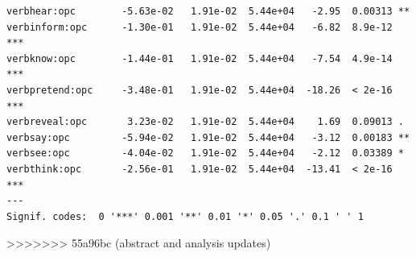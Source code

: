 \documentclass[10pt]{article}\usepackage[]{graphicx}\usepackage[dvipsnames]{xcolor}
\makeatletter
\newenvironment{kframe}{%
 \def\at@end@of@kframe{}%
 \ifinner\ifhmode%
  \def\at@end@of@kframe{\end{minipage}}%
  \begin{minipage}{\columnwidth}%
 \fi\fi%
 \def\FrameCommand##1{\hskip\@totalleftmargin \hskip-\fboxsep
 \colorbox{shadecolor}{##1}\hskip-\fboxsep
     \hskip-\linewidth \hskip-\@totalleftmargin \hskip\columnwidth}%
 \MakeFramed {\advance\hsize-\width
   \@totalleftmargin\z@ \linewidth\hsize
   \@setminipage}}%
 {\par\unskip\endMakeFramed%
 \at@end@of@kframe}
\newenvironment{knitrout}{}{} %
\makeatother
\begin{document}
\begin{knitrout}
\begin{kframe}
\begin{verbatim}
verbhear:opc        -5.63e-02   1.91e-02  5.44e+04   -2.95  0.00313 ** 
verbinform:opc      -1.30e-01   1.91e-02  5.44e+04   -6.82  8.9e-12 ***
verbknow:opc        -1.44e-01   1.91e-02  5.44e+04   -7.54  4.9e-14 ***
verbpretend:opc     -3.48e-01   1.91e-02  5.44e+04  -18.26  < 2e-16 ***
verbreveal:opc       3.23e-02   1.91e-02  5.44e+04    1.69  0.09013 .  
verbsay:opc         -5.94e-02   1.91e-02  5.44e+04   -3.12  0.00183 ** 
verbsee:opc         -4.04e-02   1.91e-02  5.44e+04   -2.12  0.03389 *  
verbthink:opc       -2.56e-01   1.91e-02  5.44e+04  -13.41  < 2e-16 ***
---
Signif. codes:  0 '***' 0.001 '**' 0.01 '*' 0.05 '.' 0.1 ' ' 1
\end{verbatim}
\end{kframe}
\end{knitrout}
>>>>>>> 55a96bc (abstract and analysis updates)
\end{document}
